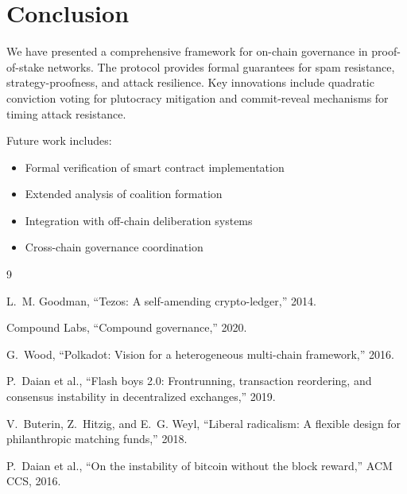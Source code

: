 \documentclass[11pt,a4paper]{article}
\theoremstyle{definition}
\theoremstyle{remark}
\begin{document}
\section{Conclusion}

We have presented a comprehensive framework for on-chain governance in proof-of-stake networks. The protocol provides formal guarantees for spam resistance, strategy-proofness, and attack resilience. Key innovations include quadratic conviction voting for plutocracy mitigation and commit-reveal mechanisms for timing attack resistance.

Future work includes:
\begin{itemize}
    \item Formal verification of smart contract implementation
    \item Extended analysis of coalition formation
    \item Integration with off-chain deliberation systems
    \item Cross-chain governance coordination
\end{itemize}


\begin{thebibliography}{9}

L.~M. Goodman, ``Tezos: A self-amending crypto-ledger,'' 2014.

Compound Labs, ``Compound governance,'' 2020.

G.~Wood, ``Polkadot: Vision for a heterogeneous multi-chain framework,'' 2016.

P.~Daian et al., ``Flash boys 2.0: Frontrunning, transaction reordering, and consensus instability in decentralized exchanges,'' 2019.

V.~Buterin, Z.~Hitzig, and E.~G. Weyl, ``Liberal radicalism: A flexible design for philanthropic matching funds,'' 2018.

P.~Daian et al., ``On the instability of bitcoin without the block reward,'' ACM CCS, 2016.

\end{thebibliography}
\end{document}
